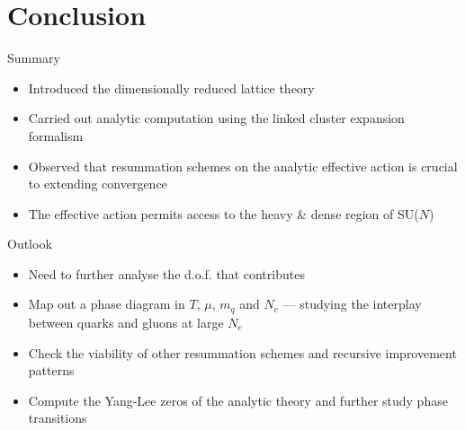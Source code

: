 \section{Conclusion}

\begin{frame}{Summary}

  \begin{itemize}
    \setlength\itemsep{1em}
    \item Introduced the \alert{dimensionally reduced} lattice theory
    \item Carried out analytic computation using the \alert{linked cluster expansion}
      formalism
    \item Observed that \alert{resummation schemes} on  the analytic
      effective action is crucial to extending convergence
    \item The effective action permits access to the \alert{heavy \& dense} region of
      SU($N$)
  \end{itemize}
  
\end{frame}

\begin{frame}{Outlook}

  \begin{itemize}
    \setlength\itemsep{1em}
    \item Need to further analyse the \alert{d.o.f.} that contributes
    \item Map out a phase diagram in $T$, $\mu$, $m_q$ and $N_c$ --- studying
      the \alert{interplay} between quarks and gluons at large $N_c$
    \item Check the viability of other \alert{resummation schemes} and
      \alert{recursive improvement} patterns
    \item Compute the \alert{Yang-Lee zeros} of the analytic theory and further
      study phase transitions
  \end{itemize}

\end{frame}
